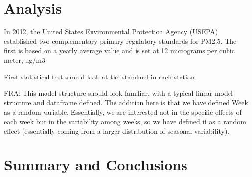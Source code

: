 \documentclass[12pt,]{article}
\begin{document}
\newpage

\section{Analysis}\label{analysis}

In 2012, the United States Environmental Protection Agency (USEPA)
established two complementary primary regulatory standards for PM2.5.
The first is based on a yearly average value and is set at 12 micrograms
per cubic meter, ug/m3,

First statistical test should look at the standard in each station.

FRA: This model structure should look familiar, with a typical linear
model structure and dataframe defined. The addition here is that we have
defined Week as a random variable. Essentially, we are interested not in
the specific effects of each week but in the variability among weeks, so
we have defined it as a random effect (essentially coming from a larger
distribution of seasonal variability).

\newpage

\section{Summary and Conclusions}\label{summary-and-conclusions}
\end{document}
